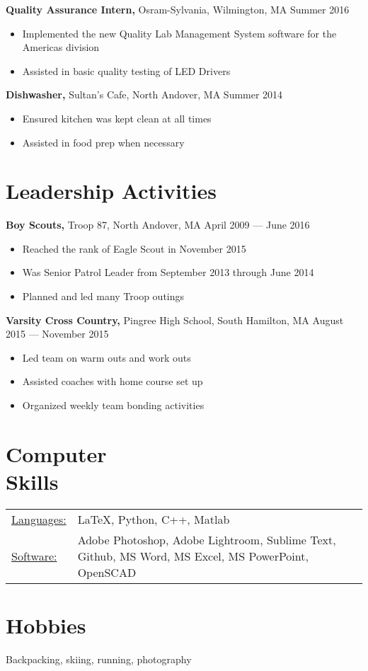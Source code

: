 \documentclass[margin]{res}
\begin{document}
\begin{resume}
	{\bf Quality Assurance Intern,} Osram-Sylvania, Wilmington, MA \hfill Summer 2016
	\begin{itemize} \itemsep -2pt
		\item Implemented the new Quality Lab Management System software for the Americas division
		\item Assisted in basic quality testing of LED Drivers
	\end{itemize}

	{\bf Dishwasher,} Sultan's Cafe, North Andover, MA \hfill Summer 2014
	\begin{itemize} \itemsep -2pt
		\item Ensured kitchen was kept clean at all times
		\item Assisted in food prep when necessary
	\end{itemize}

	\section{Leadership Activities}
	{\bf Boy Scouts,} Troop 87, North Andover, MA \hfill April 2009 --- June 2016
	\begin{itemize} \itemsep -2pt
		\item Reached the rank of Eagle Scout in November 2015
		\item Was Senior Patrol Leader from September 2013 through June 2014
		\item Planned and led many Troop outings
	\end{itemize}
	{\bf Varsity Cross Country,} Pingree High School, South Hamilton, MA \hfill August 2015 --- November 2015
	\begin{itemize} \itemsep -2pt
		\item Led team on warm outs and work outs
		\item Assisted coaches with home course set up
		\item Organized weekly team bonding activities
	\end{itemize}

	\section{Computer \\ Skills}
	\begin{tabular}{l p{3.5in}}
		\underline{Languages:} & \LaTeX, Python, C++, Matlab \\

		\underline{Software:}  & Adobe Photoshop, Adobe Lightroom, Sublime Text, Github, MS Word, MS Excel, MS PowerPoint, OpenSCAD
	\end{tabular}

	\section{Hobbies}
	Backpacking, skiing, running, photography

\end{resume}
\end{document}
